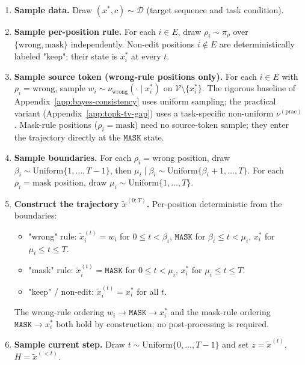 \documentclass{llmxive}
\providecommand{\xstar}{x^{\ast}}
\providecommand{\mask}{\texttt{MASK}}
\begin{document}
\begin{enumerate}
    \item \textbf{Sample data.} Draw $(\xstar, c) \sim \mathcal{D}$ (target sequence and task condition).

    \item \textbf{Sample per-position rule.} For each $i \in E$, draw $\rho_i \sim \pi_\rho$ over $\{\mathrm{wrong}, \mathrm{mask}\}$ independently. Non-edit positions $i \notin E$ are deterministically labeled "keep"; their state is $\xstar_i$ at every $t$.

    \item \textbf{Sample source token (wrong-rule positions only).} For each $i \in E$ with $\rho_i = \mathrm{wrong}$, sample $w_i \sim \nu_{\mathrm{wrong}}(\cdot \mid \xstar_i)$ on $\mathcal{V} \setminus \{\xstar_i\}$. The rigorous baseline of Appendix~\ref{app:bayes-consistency} uses uniform sampling; the practical variant (Appendix~\ref{app:topk-tv-gap}) uses a task-specific non-uniform $\nu^{(\mathrm{prac})}$. Mask-rule positions ($\rho_i = \mathrm{mask}$) need no source-token sample; they enter the trajectory directly at the $\mask$ state.

    \item \textbf{Sample boundaries.} For each $\rho_i = \mathrm{wrong}$ position, draw $\beta_i \sim \mathrm{Uniform}\{1, \ldots, T-1\}$, then $\mu_i \mid \beta_i \sim \mathrm{Uniform}\{\beta_i + 1, \ldots, T\}$. For each $\rho_i = \mathrm{mask}$ position, draw $\mu_i \sim \mathrm{Uniform}\{1, \ldots, T\}$.

    \item \textbf{Construct the trajectory $\tilde{x}^{(0:T)}$.} Per-position deterministic from the boundaries:
    \begin{itemize}
        \item "wrong" rule: $\tilde{x}^{(t)}_i = w_i$ for $0 \leq t < \beta_i$, $\mask$ for $\beta_i \leq t < \mu_i$, $\xstar_i$ for $\mu_i \leq t \leq T$.
        \item "mask" rule: $\tilde{x}^{(t)}_i = \mask$ for $0 \leq t < \mu_i$, $\xstar_i$ for $\mu_i \leq t \leq T$.
        \item "keep" / non-edit: $\tilde{x}^{(t)}_i = \xstar_i$ for all $t$.
    \end{itemize}
    The wrong-rule ordering $w_i \to \mask \to \xstar_i$ and the mask-rule ordering $\mask \to \xstar_i$ both hold by construction; no post-processing is required.

    \item \textbf{Sample current step.} Draw $t \sim \mathrm{Uniform}\{0, \ldots, T-1\}$ and set $z = \tilde{x}^{(t)}$, $H = \tilde{x}^{(<t)}$.


\end{enumerate}
\end{document}
